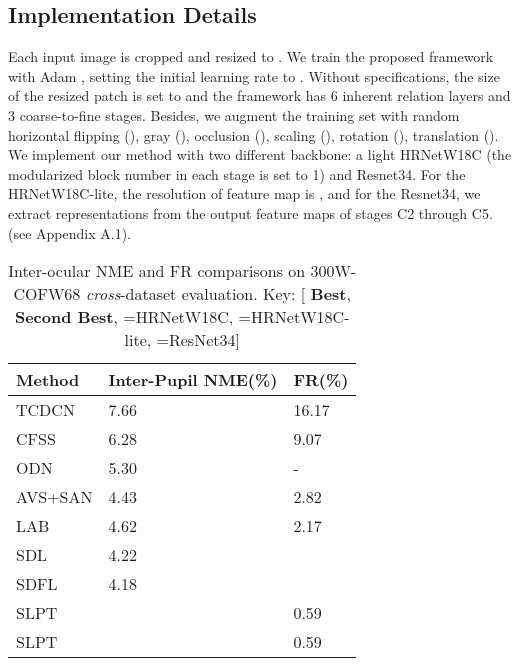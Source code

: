 \documentclass[10pt,twocolumn,letterpaper]{article}
\begin{document}
\subsection{Implementation Details}
Each input image is cropped and resized to . We train the proposed framework with Adam \cite{Adam}, setting the initial learning rate to . Without specifications, the size of the resized patch is set to  and the framework has 6 inherent relation layers and 3 coarse-to-fine stages. Besides, we augment the training set with random  horizontal flipping (), gray (), occlusion (), scaling (), rotation (), translation (). We implement our method with two different backbone: a light HRNetW18C \cite{HRnet} (the modularized block number in each stage is set to 1) and Resnet34\cite{Resnet}. For the HRNetW18C-lite, the resolution of feature map is , and for the Resnet34, we extract representations from the output feature maps of stages C2 through C5. (see Appendix A.1).


\begin{table}[t!]
	\centering
	\begin{tabular}{m{2.4cm}<{\centering}|m{1.8cm}<{\centering}m{1.6cm}<{\centering}}
		\hline
		Method & Inter-Pupil NME(\%) & FR(\%) \\ \hline
		TCDCN \cite{TCDNN} & 7.66 & 16.17 \\
		CFSS \cite{CFSS} & 6.28 & 9.07 \\
		ODN \cite{ODN} & 5.30 & - \\
		AVS+SAN \cite{AVS} & 4.43 & 2.82 \\
		LAB \cite{LAB} & 4.62 & 2.17 \\
		SDL \cite{SDL} & 4.22 & {\color{blue} } \\
		SDFL \cite{SCDF} & 4.18 & {\color{red} } \\ \hline
		SLPT & {\color{blue} } & 0.59  \\
		SLPT & {\color{red} } & 0.59 \\ \hline
	\end{tabular}
	\caption{Inter-ocular NME and FR comparisons on 300W-COFW68 \textit{cross}-dataset evaluation. Key: [{\color{red} \textbf{Best}}, {\color{blue} \textbf{Second Best}}, =HRNetW18C, =HRNetW18C-lite, =ResNet34]}
	\label{Tabal4}
\end{table}
\end{document}
